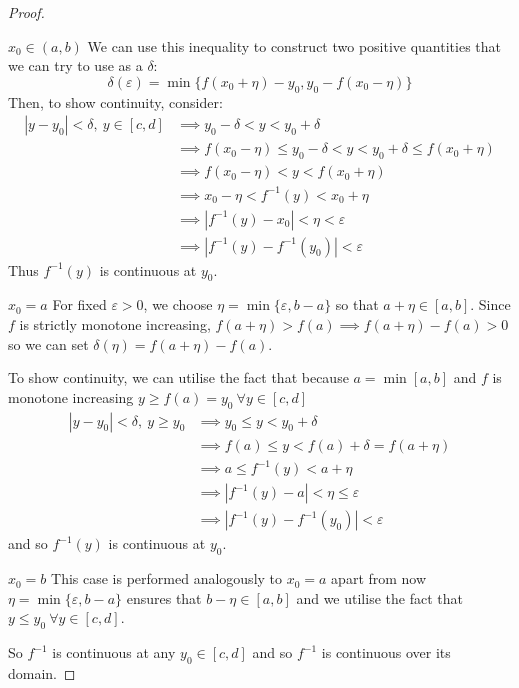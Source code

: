 \documentclass[../main.tex]{subfiles}
\begin{document}
\begin{proof}
\begin{proofcases}
\begin{case}{$x_0 \in (a, b)$}
      We can use this inequality to construct two positive quantities that we can try to use as a $\delta$:
      \[
        \delta(\varepsilon) = \min\{f(x_0 + \eta) - y_0, y_0 - f(x_0 - \eta)\}
      \]
      Then, to show continuity, consider:
      \begin{align*}
        |y -  y_0| < \delta,\ y \in [c, d] &\implies y_0 - \delta < y < y_0 + \delta \\
                                           &\implies f(x_0 - \eta) \leq y_0 - \delta < y < y_0 + \delta \leq f(x_0 + \eta) \\
                                           &\implies f(x_0 - \eta) < y < f(x_0 + \eta) \\
                                           &\implies x_0 - \eta < f^{-1}(y) < x_0 + \eta \\
                                           &\implies |f^{-1}(y) - x_0| < \eta < \varepsilon \\
                                           &\implies |f^{-1}(y) - f^{-1}(y_0)| < \varepsilon
      \end{align*}
      Thus $f^{-1}(y)$ is continuous at $y_0$.
    \end{case}
    \begin{case}{$x_0 = a$}
      For fixed $\varepsilon > 0$, we choose $\eta = \min\{\varepsilon, b - a\}$ so that $a + \eta \in [a, b]$.
      Since $f$ is strictly monotone increasing, $f(a + \eta) > f(a) \implies f(a + \eta) - f(a) > 0$ so we can set $\delta(\eta) = f(a + \eta) - f(a)$.

      To show continuity, we can utilise the fact that because $a = \min [a, b]$ and $f$ is monotone increasing $y \geq f(a) = y_0\ \forall y \in [c, d]$
      \begin{align*}
        |y - y_0| < \delta,\ y \geq y_0 &\implies y_0 \leq y < y_0 + \delta \\
                                        &\implies f(a) \leq y < f(a) + \delta = f(a + \eta) \\
                                        &\implies a \leq f^{-1}(y) < a + \eta \\
                                        &\implies |f^{-1}(y) - a| < \eta \leq \varepsilon \\
                                        &\implies |f^{-1}(y) - f^{-1}(y_0)| < \varepsilon
      \end{align*}
      and so $f^{-1}(y)$ is continuous at $y_0$.
    \end{case}
    \begin{case}{$x_0 = b$}
      This case is performed analogously to $x_0 = a$ apart from now $\eta = \min\{\varepsilon, b - a\}$ ensures that $b - \eta \in [a, b]$ and we utilise the fact that $y \leq y_0\ \forall y \in [c, d]$.
    \end{case}
  \end{proofcases}
  So $f^{-1}$ is continuous at any $y_0 \in [c, d]$ and so $f^{-1}$ is continuous over its domain.
\end{proof}
\end{document}
